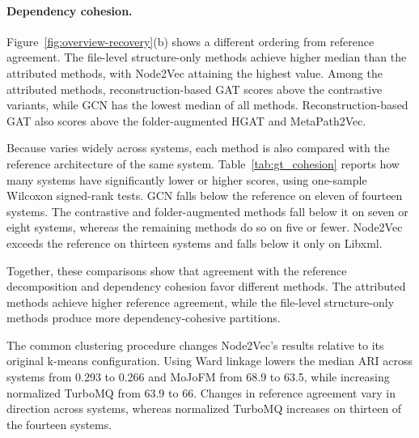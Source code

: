 \paragraph{Dependency cohesion.} Figure~\ref{fig:overview-recovery}(b) shows a different ordering from reference agreement. The file-level structure-only methods achieve higher median \tmq{} than the attributed methods, with Node2Vec attaining the highest value. Among the attributed methods, reconstruction-based GAT scores above the contrastive variants, while GCN has the lowest median of all methods. Reconstruction-based GAT also scores above the folder-augmented HGAT and MetaPath2Vec.

Because \tmq{} varies widely across systems, each method is also compared with the reference architecture of the same system. Table~\ref{tab:gt_cohesion} reports how many systems have significantly lower or higher scores, using one-sample Wilcoxon signed-rank tests. GCN falls below the reference on eleven of fourteen systems. The contrastive and folder-augmented methods fall below it on seven or eight systems, whereas the remaining methods do so on five or fewer. Node2Vec exceeds the reference on thirteen systems and falls below it only on Libxml.

Together, these comparisons show that agreement with the reference decomposition and dependency cohesion favor different methods. The attributed methods achieve higher reference agreement, while the file-level structure-only methods produce more dependency-cohesive partitions.

The common clustering procedure changes Node2Vec's results relative to its original k-means configuration. Using Ward linkage lowers the median ARI across systems from 0.293 to 0.266 and MoJoFM from 68.9 to 63.5, while increasing normalized TurboMQ from 63.9 to 66. Changes in reference agreement vary in direction across systems, whereas normalized TurboMQ increases on thirteen of the fourteen systems.

